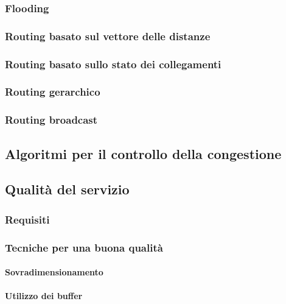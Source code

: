 \subsubsection{Flooding}

\subsubsection{Routing basato sul vettore delle distanze}

\subsubsection{Routing basato sullo stato dei collegamenti} %

\subsubsection{Routing gerarchico}

\subsubsection{Routing broadcast}

\subsection{Algoritmi per il controllo della congestione} 

\subsection{Qualità del servizio}

\subsubsection{Requisiti}

\subsubsection{Tecniche per una buona qualità}

\paragraph{Sovradimensionamento}

\paragraph{Utilizzo dei buffer}

